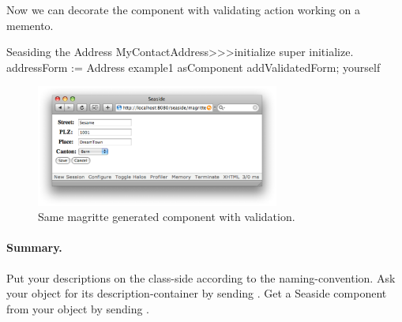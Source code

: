 \documentclass[a4paper,10pt,twoside]{book}
\begin{document}
Now we can decorate the component with validating action working on a memento.
\begin{method}{Seasiding the Address}
MyContactAddress>>>initialize
	super initialize.
	addressForm := Address example1 asComponent addValidatedForm; yourself
\end{method}


\begin{figure}
\begin{center}
\includegraphics[width=8cm]{addressSaveCancel}
\caption{Same magritte generated component with validation.}
\end{center}
\end{figure}




% 
% 
% 
% 
% 
% 
% 
% 


\paragraph{Summary.}
Put your descriptions on the class-side according to the naming-convention.
Ask your object for its description-container by sending .
Get a Seaside component from  your object by sending .
\end{document}
